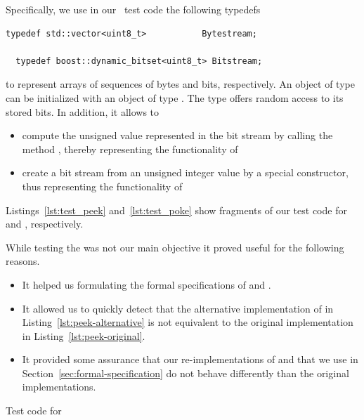 Specifically, we use in our \CC\ test code the following typedefs

\begin{lstlisting}[style = acsl-block]
  typedef std::vector<uint8_t>           Bytestream;

  typedef boost::dynamic_bitset<uint8_t> Bitstream;
\end{lstlisting}

to represent arrays of sequences of bytes and bits, respectively.
An object of type  can be initialized with an object
of type . The type  offers random access
to its stored bits.
In addition, it allows to
\begin{itemize}
\item  compute the unsigned value represented in the bit stream by calling the
       method , thereby representing the functionality of \peek
\item  create a bit stream from an unsigned integer value by a special constructor,
       thus representing the functionality of \poke
\end{itemize}

Listings~\ref{lst:test_peek} and~\ref{lst:test_poke} show fragments of our test code
for \peek and \poke, respectively.

While testing the \bitwalker was not our main objective it proved useful for
the following reasons.

\begin{itemize}
\item It helped us formulating the formal specifications of \peek and \poke.
  
\item It allowed us to quickly detect that the alternative implementation of
      \peek in Listing~\ref{lst:peek-alternative} is not equivalent to the
      original implementation in Listing~\ref{lst:peek-original}.

\item It provided some assurance that our re-implementations of \peek and \poke
      that we use in Section~\ref{sec:formal-specification} do not behave differently
      than the original implementations.
\end{itemize}

\clearpage

\begin{listing}[hbt]
\begin{minipage}{\textwidth}

\end{minipage}
\caption{\label{lst:test_peek} Test code for \peek}
\end{listing}

